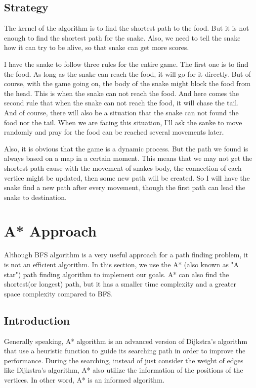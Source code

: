 \documentclass[12pt]{article}
\begin{document}
\subsection{Strategy}

The kernel of the algorithm is to find the shortest path to the food. But it is not enough to
find the shortest path for the snake. Also, we need to tell the snake how it can try to be 
alive, so that snake can get more scores. 

I have the snake to follow three rules for the entire game. The first one is to find the food. 
As long as the snake can reach the food, it will go for it directly. But of course, with the 
game going on, the body of the snake might block the food from the head. This is when the snake
can not reach the food. And here comes the second rule that when the snake can not reach the 
food, it will chase the tail. And of course, there will also be a situation that the snake can
not found the food nor the tail. When we are facing this situation, I'll ask the sanke to move 
randomly and pray for the food can be reached several movements later.

Also, it is obvious that the game is a dynamic process. But the path we found is always based on a map in a certain moment. This means that we may not get the shortest path cause with the movement of snakes body, the connection of each vertice might be updated, then some new path will be created. So I will have the snake find a new path after every movement, though the first path can lead the snake to destination.

\section{A* Approach}
Although BFS algorithm is a very useful approach for a path finding problem, it is not an efficient algorithm. In this section, we use the A* (also known as "A star") path finding algorithm to implement our goals. A* can also find the shortest(or longest) path, but it has a smaller time complexity and a greater space complexity compared to BFS. 

\subsection{Introduction}
Generally speaking, A* algorithm is an advanced version of Dijkstra's algorithm that use a heuristic function to guide its searching path in order to improve the performance. During the searching, instead of just consider the weight of edges like Dijkstra's algorithm, A* also utilize the information of the positions of the vertices. In other word, A* is an informed algorithm. 
\end{document}
